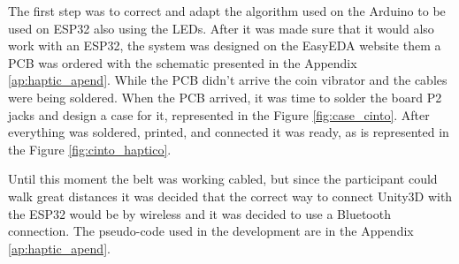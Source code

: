  The first step was to correct and adapt the algorithm used on the Arduino to be used on ESP32 also using the LEDs. After it was made sure that it would also work with an ESP32, the system was designed on the EasyEDA website \cite{easyeda} them a PCB was ordered with the schematic presented in the Appendix \ref{ap:haptic_apend}. While the PCB didn't arrive the coin vibrator and the cables were being soldered. When the PCB arrived, it was time to solder the board P2 jacks and design a case for it, represented in the Figure \ref{fig:case_cinto}. After everything was soldered, printed, and connected it was ready, as is represented in the Figure \ref{fig:cinto_haptico}.
 

 
 Until this moment the belt was working cabled, but since the participant could walk great distances it was decided that the correct way to connect Unity3D with the ESP32 would be by wireless and it was decided to use a Bluetooth connection. The pseudo-code used in the development are in the Appendix \ref{ap:haptic_apend}.
